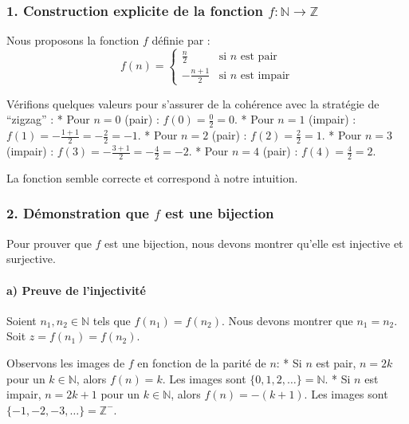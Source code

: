 \documentclass[12pt,a4paper]{report}
\begin{document}
\subsubsection{\texorpdfstring{1. Construction explicite de la fonction
\(f: \mathbb{N} \to \mathbb{Z}\)}{1. Construction explicite de la fonction f: \textbackslash mathbb\{N\} \textbackslash to \textbackslash mathbb\{Z\}}}\label{construction-explicite-de-la-fonction-f-mathbbn-to-mathbbz}

Nous proposons la fonction \(f\) définie par :
\[ f(n) = \begin{cases} \frac{n}{2} & \text{si } n \text{ est pair} \\ -\frac{n+1}{2} & \text{si } n \text{ est impair} \end{cases} \]

Vérifions quelques valeurs pour s'assurer de la cohérence avec la
stratégie de ``zigzag'' : * Pour \(n=0\) (pair) :
\(f(0) = \frac{0}{2} = 0\). * Pour \(n=1\) (impair) :
\(f(1) = -\frac{1+1}{2} = -\frac{2}{2} = -1\). * Pour \(n=2\) (pair) :
\(f(2) = \frac{2}{2} = 1\). * Pour \(n=3\) (impair) :
\(f(3) = -\frac{3+1}{2} = -\frac{4}{2} = -2\). * Pour \(n=4\) (pair) :
\(f(4) = \frac{4}{2} = 2\).

La fonction semble correcte et correspond à notre intuition.

\subsubsection{\texorpdfstring{2. Démonstration que \(f\) est une
bijection}{2. Démonstration que f est une bijection}}\label{duxe9monstration-que-f-est-une-bijection}

Pour prouver que \(f\) est une bijection, nous devons montrer qu'elle
est injective et surjective.

\paragraph{a) Preuve de
l'injectivité}\label{a-preuve-de-linjectivituxe9}

Soient \(n_1, n_2 \in \mathbb{N}\) tels que \(f(n_1) = f(n_2)\). Nous
devons montrer que \(n_1 = n_2\). Soit \(z = f(n_1) = f(n_2)\).

Observons les images de \(f\) en fonction de la parité de \(n\): * Si
\(n\) est pair, \(n=2k\) pour un \(k \in \mathbb{N}\), alors
\(f(n) = k\). Les images sont \(\{0, 1, 2, \dots\} = \mathbb{N}\). * Si
\(n\) est impair, \(n=2k+1\) pour un \(k \in \mathbb{N}\), alors
\(f(n) = -(k+1)\). Les images sont
\(\{-1, -2, -3, \dots\} = \mathbb{Z}^-\).
\end{document}
